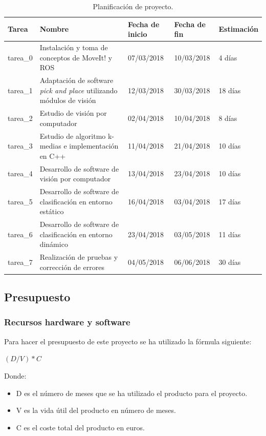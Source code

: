 \begin{table}[!h]
	\centering
	\begin{tabular}{|p{2cm} | p{5cm} | p{2cm} | p{2cm} | p{2cm} |}
		\hline
		\textbf{Tarea} & \textbf{Nombre} & \textbf{Fecha de inicio} & \textbf{Fecha de fin} & \textbf{Estimación} \\
		\hline
		tarea\_0 & Instalación y toma de conceptos de MoveIt! y ROS & 07/03/2018 & 10/03/2018 & 4 días\\
		\hline
		tarea\_1 & Adaptación de software \textit{pick and place} utilizando módulos de visión & 12/03/2018 & 30/03/2018 & 18 días \\
		\hline
		tarea\_2 & Estudio de visión por computador & 02/04/2018 & 10/04/2018 & 8 días \\
		\hline
		tarea\_3 & Estudio de algoritmo k-medias e implementación en C++ & 11/04/2018 & 21/04/2018 & 10 días \\
		\hline 
		tarea\_4 & Desarrollo de software de visión por computador & 13/04/2018 & 23/04/2018 & 10 días \\
		\hline
		tarea\_5 & Desarrollo de software de clasificación en entorno estático & 16/04/2018 & 03/04/2018 & 17 días \\
		\hline
		tarea\_6 & Desarrollo de software de clasificación en entorno dinámico & 23/04/2018 & 03/05/2018 & 11 días \\
		\hline
		tarea\_7 & Realización de pruebas y corrección de errores & 04/05/2018 & 06/06/2018 & 30 días \\
		\hline
		
	\end{tabular}
	\caption{Planificación de proyecto.}
	\label{cuad:plan}
\end{table}

\newpage
\subsection{Presupuesto}

\subsubsection{Recursos hardware y software}

\noindent Para hacer el presupuesto de este proyecto se ha utilizado la fórmula siguiente:
\begin{center}
	$ (D/V) * C $
\end{center}

\noindent Donde:
\begin{itemize}
	\item D es el número de meses que se ha utilizado el producto para el proyecto.
	\item V es la vida útil del producto en número de meses.
	\item C es el coste total del producto en euros. \\
\end{itemize}

